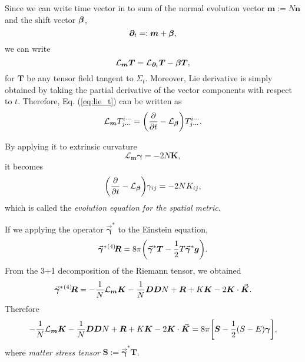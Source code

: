 Since we can write time vector in to sum of the normal evolution vector $\bm{m} := N\bm{n}$ and the shift vector $\bm{\beta}$,
\begin{equation}
	\label{eq:timevec}
	\bm{\partial}_t =: \bm{m} + \bm{\beta},
\end{equation}
we can write
\begin{equation}
	\label{eq:lie_t}
	\mathcal{L}_{\bm{m}}\bm{T} = \mathcal{L}_{\bm{\partial}_t}\bm{T} - \mathcal{\bm{\beta}}\bm{T},
\end{equation}
for $\bm{T}$ be any tensor field tangent to $\Sigma_t$. Moreover, Lie derivative is simply obtained by taking the partial derivative of the vector components with respect to $t$. Therefore, Eq. (\ref{eq:lie_t}) can be written as
\begin{equation}
	\mathcal{L}_{\bm{m}} T^{i\cdots}_{j\cdots} = \qty(\pdv{t} - \mathcal{L}_{\bm{\beta}}) T^{i\cdots}_{j\cdots}.
\end{equation}

By applying it to extrinsic curvature
\begin{equation}
	\mathcal{L}_{\bm{m}} \bm{\gamma} = -2N \bm{K},
\end{equation}
it becomes
\begin{equation}
	\qty(\pdv{t} - \mathcal{L}_{\bm{\beta}})\gamma_{ij} = -2NK_{ij},
\end{equation}
which is called the \emph{evolution equation for the spatial metric}.

If we applying the operator $\vec{\bm{\gamma}}^{\ast}$ to the Einstein equation,
\begin{equation}
	\vec{\bm{\gamma}}^{\ast} {}^{(4)}\hspace{-0.2em} \bm{R} = 8 \pi \qty( \vec{\bm{\gamma}}^{\ast} \bm{T} - \frac{1}{2}T \vec{\bm{\gamma}}^{\ast} \bm{g}).
\end{equation}
From the 3+1 decomposition of the Riemann tensor, we obtained
\begin{equation}
	\vec{\bm{\gamma}}^{\ast} {}^{(4)}\hspace{-0.2em} \bm{R} = -\frac{1}{N} \mathcal{L}_{\bm{m}} \bm{K}- \frac{1}{N}\bm{D}\bm{D} N + \bm{R} + K \bm{K} - 2 \bm{K} \cdot \vec{\bm{K}}.
\end{equation}
Therefore
\begin{equation}
	\label{eq:full_projection}
	- \frac{1}{N} \mathcal{L}_{\bm{m}}\bm{K} - \frac{1}{N}\bm{D}\bm{D}N + \bm{R} + K \bm{K} - 2\bm{K}\cdot \vec{\bm{K}} = 8 \pi \qty [\bm{S} - \frac{1}{2}(S-E)\bm{\gamma}],
\end{equation}
where \emph{matter stress tensor} $\bm{S}:= \vec{\bm{\gamma}}^{\ast} \bm{T}$.

